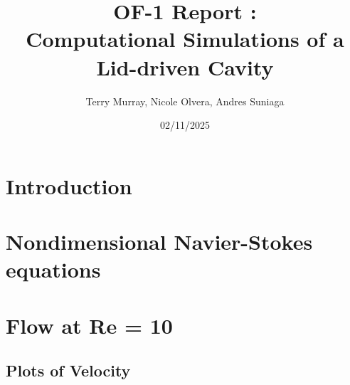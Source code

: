 \documentclass[11pt]{article}
\title{\bf OF-1 Report : \\[2mm] Computational Simulations of a Lid-driven Cavity}
\author{Terry Murray, Nicole Olvera, Andres Suniaga}
\date{02/11/2025}
\begin{document}
\maketitle

\noindent\makebox[\textwidth]{\rule{\textwidth}{0.2pt}}
\tableofcontents
\noindent\makebox[\textwidth]{\rule{\textwidth}{0.2pt}}
\pagebreak

\section{Introduction}

\section{Nondimensional Navier-Stokes equations}

\pagebreak

\section{Flow at Re = 10}

\subsection{Plots of Velocity}
\end{document}
